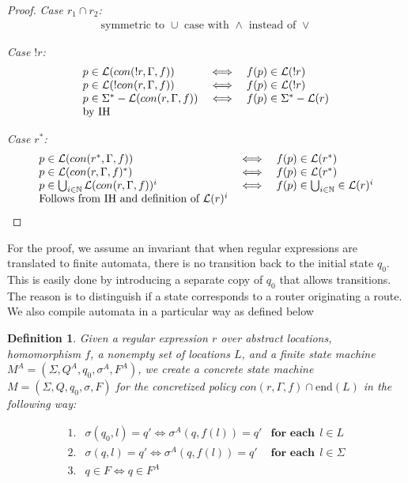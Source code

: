 \documentclass[twocolumn, openany]{sig-alternate-10pt}
\newcommand{\EndR}{\ensuremath{\mathrm{end}}}
\newtheorem{defn}{Definition}
\begin{document}
\begin{proof}
\emph{Case $r_1 \cap r_2$:} 
  \[ \begin{array}{c}
    \text{symmetric to } \cup \text{ case with } \wedge \text{ instead of } \vee
  \end{array} \]

\emph{Case $!r$:}
  \[ \begin{array}{lll}
    p \in \mathcal{L}(con(!r,\Gamma,f)) &\iff& f(p) \in \mathcal{L}(!r) \\
    p \in \mathcal{L}(!con(r,\Gamma,f)) &\iff& f(p) \in \mathcal{L}(!r) \\
    p \in \Sigma^* - \mathcal{L}(con(r,\Gamma,f)) &\iff& f(p) \in \Sigma^* - \mathcal{L}(r) \\
    \text{by IH} & & \\
  \end{array} \]

\emph{Case $r^*$:}
  \[ \begin{array}{lll}
    p \in \mathcal{L}(con(r^*,\Gamma,f)) &\iff& f(p) \in \mathcal{L}(r^*) \\
    p \in \mathcal{L}(con(r,\Gamma,f)^*) &\iff& f(p) \in \mathcal{L}(r^*) \\
    p \in \bigcup_{i \in \mathbb{N}} \mathcal{L}(con(r,\Gamma,f))^i &\iff& f(p) \in \bigcup_{i \in \mathbb{N}} \in \mathcal{L}(r)^i \\
    \text{Follows from IH and definition of } \mathcal{L}(r)^i & & \\
  \end{array} \]

\end{proof}



\vspace{2em}
For the proof, we assume an invariant that when regular expressions are translated to finite automata, there is no transition back to the initial state $q_0$. This is easily done by introducing a separate copy of $q_0$ that allows transitions. The reason is to distinguish if a state corresponds to a router originating a route. We also compile automata in a particular way as defined below

\begin{defn}
Given a regular expression $r$ over abstract locations, homomorphism $f$, a nonempty set of locations $L$, and a finite state machine $M^A = (\Sigma,Q^A,q_0,\sigma^A,F^A)$, we create a concrete state machine $M = (\Sigma, Q, q_0, \sigma, F)$ for the concretized policy $con(r,\Gamma, f) \cap \EndR(L)$ in the following way: 

    \[ \begin{array}{lll}
      1. & \sigma(q_0,l) = q' \iff \sigma^A(q,f(l)) = q' & \textbf{for each}~~ l \in L \\
      2. & \sigma(q,l) = q' \iff \sigma^A(q,f(l)) = q' & \textbf{for each}~~ l \in \Sigma \\
      3. & q \in F \iff q \in F^A & \\
    \end{array} \]
\end{defn}
\end{document}
